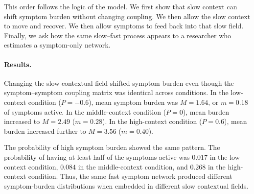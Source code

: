 This order follows the logic of the model. We first show that slow context can
shift symptom burden without changing coupling. We then allow the slow context
to move and recover. We then allow symptoms to feed back into that slow field.
Finally, we ask how the same slow--fast process appears to a researcher who
estimates a symptom-only network.



\paragraph{Results.}
Changing the slow contextual field shifted symptom burden even though the
symptom--symptom coupling matrix was identical across conditions. In the
low-context condition (\(P=-0.6\)), mean symptom burden was \(M=1.64\), or
\(m=0.18\) of symptoms active. In the middle-context condition (\(P=0\)), mean
burden increased to \(M=2.49\) (\(m=0.28\)). In the high-context condition
(\(P=0.6\)), mean burden increased further to \(M=3.56\) (\(m=0.40\)).

The probability of high symptom burden showed the same pattern. The probability
of having at least half of the symptoms active was \(0.017\) in the low-context
condition, \(0.084\) in the middle-context condition, and \(0.268\) in the
high-context condition. Thus, the same fast symptom network produced different
symptom-burden distributions when embedded in different slow contextual fields.





